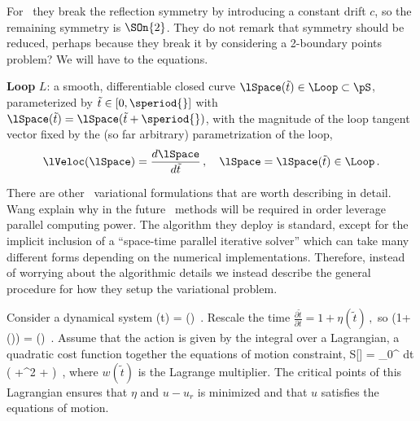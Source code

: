 For \KS\ they break the reflection symmetry by introducing a constant
drift $c$, so the remaining symmetry is $\SOn{2}$. They do not remark
that symmetry should be reduced, perhaps because they break it by
considering a 2-boundary points problem? We will have to {\slice} the
equations.

\newcommand{\lTime}{\tilde{t}}     %
\medskip
\noindent
{\bf Loop} $L$:
 a smooth, differentiable closed curve $\lSpace(\lTime)\in \Loop \subset
\pS$,
parameterized by $\lTime \in [0,\speriod{}]$ with
$\lSpace(\lTime)=\lSpace(\lTime+\speriod{})$, with the
magnitude of the loop tangent vector fixed by
the (so far arbitrary) parametrization of the loop,
\[
\lVeloc(\lSpace)=\frac{d \lSpace}{d\lTime}\,, \quad \lSpace=\lSpace(\lTime) \in \Loop
\,.
\]

There are other \spt\ variational formulations
that are worth describing in detail.
Wang \etal{} explain
why in the future \spt\ methods will be required in order
leverage parallel computing power. The algorithm
they deploy is standard,
except for the implicit inclusion of a ``space-time
parallel iterative solver'' which can take
many different forms
depending on the numerical implementations.
Therefore, instead of worrying about the
algorithmic details we instead describe
the general procedure for how they
setup the variational problem.

Consider a dynamical system
\beq
	\dot{\ssp}(t)  =  \vel(\ssp)
\,.
Rescale the time
\(
\frac{\partial\lTime}{\partial t} = 1 + \eta(\lTime)
\,,
\)
so
\beq
(1+\eta(\lTime))\frac{\partial\ssp(t(\lTime))}{\partial\lTime}  =  \vel(\ssp)
\,.
Assume that the action is given by the integral over a Lagrangian, a
quadratic cost function together the equations of motion constraint,
\beq
S[\Loop] =
   \int_0^{\period{}} dt\,\left(
\braket{\ssp-\lSpace}{\ssp-\lSpace}+\eta^2
+ 
    \right)
\,,
\label{WGBGQ13(3)}
\eeq
where $w(\lTime)$ is the Lagrange multiplier. The critical
points of this Lagrangian ensures that $\eta$ and $u-u_r$
is minimized and that $u$ satisfies the equations of motion.


